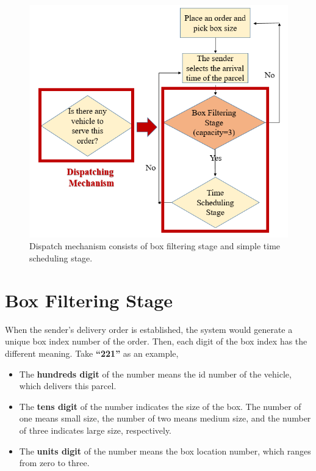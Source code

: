 \documentclass[12pt]{ksthesis}
\begin{document}
\begin{thesis}
{\begin{figure}[H]
\centering
\includegraphics[scale=0.7]{./Thesis_figures/F6-1_dispatching_mechanism.PNG}
\caption{\large Dispatch mechanism consists of box filtering stage and simple time scheduling stage.}
\vspace{0.5cm}
\label{Fig:Dispatch_mechanism}
\end{figure}

\section{Box Filtering Stage }
When the sender’s delivery order is established, the system would generate a unique box index number of the order. Then, each digit of the box index has the different meaning. Take \textbf{“221”} as an example,

\begin{itemize}


\item
The \textbf{hundreds digit} of the number means the id number of the vehicle, which delivers this parcel.

\item
The \textbf{tens digit} of the number indicates the size of the box. The number of one means small size, the number of two means medium size, and the number of three indicates large size, respectively.

\item
The \textbf{units digit} of the number means the box location number, which ranges from zero to three. 


\end{itemize}}
\end{thesis}
\end{document}
